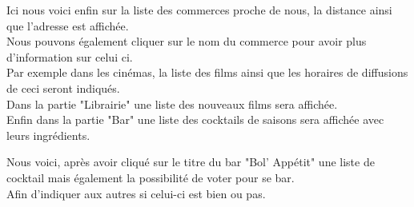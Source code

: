 \documentclass[10pt,a4paper, landscape]{report}
\begin{document}
{{{{Ici nous voici enfin sur la liste des commerces proche de nous, la distance ainsi que l'adresse est affichée. \\
Nous pouvons également cliquer sur le nom du commerce pour avoir plus d'information sur celui ci. \\
Par exemple dans les cinémas, la liste des films ainsi que les horaires de diffusions de ceci seront indiqués. \\
Dans la partie "Librairie" une liste des nouveaux films sera affichée. \\
Enfin dans la partie "Bar" une liste des cocktails de saisons sera affichée avec leurs ingrédients. \\
{%
\setlength{\fboxsep}{0pt}%
\setlength{\fboxrule}{2pt}%
%

\newpage
Nous voici, après avoir cliqué sur le titre du bar "Bol' Appétit" une liste de cocktail mais également la possibilité de voter pour se bar. \\
Afin d'indiquer aux autres si celui-ci est bien ou pas. \\
{%
\setlength{\fboxsep}{0pt}%
\setlength{\fboxrule}{2pt}%
%

}}}}}}
\end{document}
